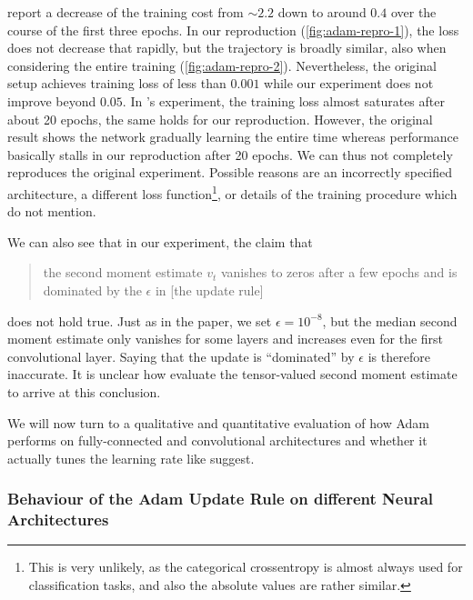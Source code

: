 \citeauthor{kingma2014adam} report a decrease of the training cost from $\sim
2.2$ down to around $0.4$ over the course of the first three epochs. In our
reproduction (\cref{fig:adam-repro-1}), the loss does not decrease that rapidly,
but the trajectory is broadly similar, also when considering the entire training
(\cref{fig:adam-repro-2}). Nevertheless, the original setup achieves training
loss of less than $0.001$ while our experiment does not improve beyond $0.05$.
In \citeauthor{kingma2014adam}'s experiment, the training loss almost saturates
after about 20 epochs, the same holds for our reproduction. However, the
original result shows the network gradually learning the entire time whereas
performance basically stalls in our reproduction after 20 epochs. We can thus
not completely reproduces the original experiment.  Possible reasons are an
incorrectly specified architecture, a different loss function\footnote{This is
    very unlikely, as the categorical crossentropy is almost always used for
classification tasks, and also the absolute values are rather similar.}, or
details of the training procedure which \citeauthor{kingma2014adam} do not
mention.

We can also see that in our experiment, the claim that
\begin{quote}
 the second moment estimate $v_t$ vanishes to zeros after a few epochs and is
 dominated by the $\epsilon$ in [the update rule]
\end{quote}
does not hold true. Just as in the paper, we set $\epsilon = 10^{-8}$, but the
median second moment estimate only vanishes for some layers and increases even
for the first convolutional layer. Saying that the update is ``dominated'' by
$\epsilon$ is therefore inaccurate. It is unclear how
\citeauthor{kingma2014adam} evaluate the tensor-valued second moment estimate to
arrive at this conclusion.

We will now turn to a qualitative and quantitative evaluation of how Adam
performs on fully-connected and convolutional architectures and whether it
actually tunes the learning rate like \citet{kingma2014adam} suggest.

\subsubsection{Behaviour of the Adam Update Rule on different Neural
Architectures}
\label{subsec:adam-behaviour}

